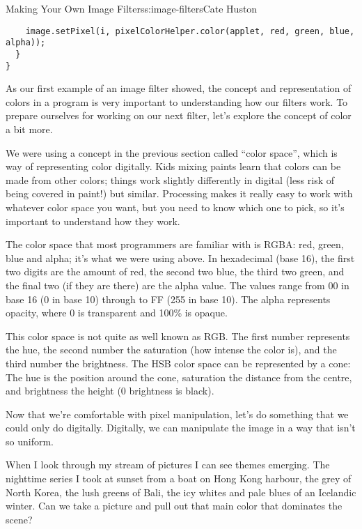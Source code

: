 \begin{aosachapter}{Making Your Own Image Filters}{s:image-filters}{Cate Huston}
\begin{verbatim}
    image.setPixel(i, pixelColorHelper.color(applet, red, green, blue, alpha));
  }
}
\end{verbatim}

\label{color}

As our first example of an image filter showed, the concept and
representation of colors in a program is very important to understanding
how our filters work. To prepare ourselves for working on our next
filter, let's explore the concept of color a bit more.

We were using a concept in the previous section called ``color space'',
which is way of representing color digitally. Kids mixing paints learn
that colors can be made from other colors; things work slightly
differently in digital (less risk of being covered in paint!) but
similar. Processing makes it really easy to work with whatever color
space you want, but you need to know which one to pick, so it's
important to understand how they work.

\label{rgb-colors}

The color space that most programmers are familiar with is RGBA: red,
green, blue and alpha; it's what we were using above. In hexadecimal
(base 16), the first two digits are the amount of red, the second two
blue, the third two green, and the final two (if they are there) are the
alpha value. The values range from 00 in base 16 (0 in base 10) through
to FF (255 in base 10). The alpha represents opacity, where 0 is
transparent and 100\% is opaque.

\label{hsb-or-hsv-colors}

This color space is not quite as well known as RGB. The first number
represents the hue, the second number the saturation (how intense the
color is), and the third number the brightness. The HSB color space can
be represented by a cone: The hue is the position around the cone,
saturation the distance from the centre, and brightness the height (0
brightness is black).

\label{extracting-the-dominant-hue-from-an-image}

Now that we're comfortable with pixel manipulation, let's do something
that we could only do digitally. Digitally, we can manipulate the image
in a way that isn't so uniform.

When I look through my stream of pictures I can see themes emerging. The
nighttime series I took at sunset from a boat on Hong Kong harbour, the
grey of North Korea, the lush greens of Bali, the icy whites and pale
blues of an Icelandic winter. Can we take a picture and pull out that
main color that dominates the scene?


\end{aosachapter}
